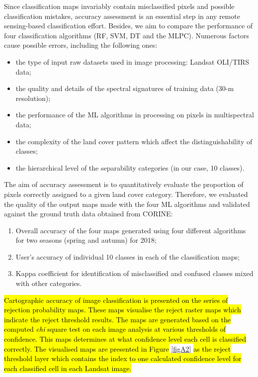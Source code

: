 \documentclass[jimaging,article,submit,pdftex,moreauthors]{Definitions/mdpi}
\begin{document}
Since classification maps invariably contain misclassified pixels and possible classification mistakes, accuracy assessment is an essential step in any remote sensing-based classification effort. Besides, we aim to compare the performance of four classification algorithms (RF, SVM, DT and {the} MLPC). Numerous factors cause possible errors, including the following ones:
\begin{itemize} 
	\item the type of input raw datasets used in image processing: Landsat OLI/TIRS data;
	\item the quality and details of the spectral signatures of training data (30-m resolution);
	\item the performance of the ML algorithms in processing on pixels in multispectral data;
	\item the complexity of the land cover pattern which affect the distinguishability of classes;
	\item the hierarchical level of the separability categories (in our case, 10 classes).
\end{itemize} 
	
The aim of accuracy assessment is to  {quantitatively evaluate the proportion of pixels correctly assigned to a given land cover category}. Therefore, we evaluated the quality of the {output maps made with the four ML algorithms and validated against the ground truth data obtained from CORINE}:
\begin{enumerate}
	\item Overall accuracy of the four maps generated using four different algorithms for two seasons (spring and autumn) {for 2018};
	\item User's accuracy of individual 10 classes in each of the classification maps;
	\item Kappa coefficient for identification of misclassified and confused classes mixed with other categories.
\end{enumerate}

\hl{Cartographic accuracy of image classification is presented on the series of rejection probability maps. These maps visualise the reject raster maps which indicate the reject threshold results. The maps are generated based on the computed \emph{chi} square test on each image analysis at various thresholds of confidence. This maps determines at what confidence level each cell is classified correctly. The visualised maps are presented in Figure} \ref{figA2} \hl{as the reject threshold layer which contains the index to one calculated confidence level for each classified cell in each Landsat image. } 
\end{document}
